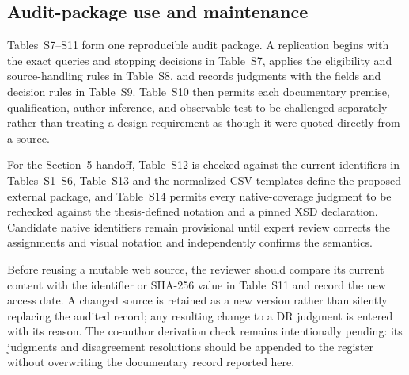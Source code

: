 \documentclass[10pt]{article}
\begin{document}
\subsection*{Audit-package use and maintenance}

Tables~S7--S11 form one reproducible audit package. A replication begins with
the exact queries and stopping decisions in Table~S7, applies the eligibility
and source-handling rules in Table~S8, and records judgments with the fields and
decision rules in Table~S9. Table~S10 then permits each documentary premise,
qualification, author inference, and observable test to be challenged
separately rather than treating a design requirement as though it were quoted
directly from a source.

For the Section~5 handoff, Table~S12 is checked against the current identifiers
in Tables~S1--S6, Table~S13 and the normalized CSV templates define the proposed
external package, and Table~S14 permits every native-coverage judgment to be
rechecked against the thesis-defined notation and a pinned XSD declaration.
Candidate native identifiers remain provisional until expert review corrects
the assignments and visual notation and independently confirms the semantics.

Before reusing a mutable web source, the reviewer should compare its current
content with the identifier or SHA-256 value in Table~S11 and record the new
access date. A changed source is retained as a new version rather than silently
replacing the audited record; any resulting change to a DR judgment is entered
with its reason. The co-author derivation check remains intentionally pending:
its judgments and disagreement resolutions should be appended to the register
without overwriting the documentary record reported here.
\end{document}
